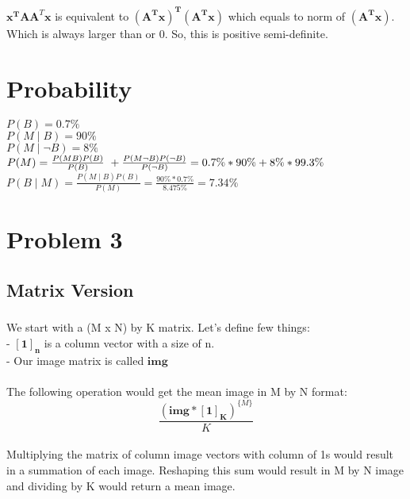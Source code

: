 \documentclass{article}
\newcommand{\matr}[1]{\mathbf{#1}}
\begin{document}
	\subsection{} %
	$\matr{{x}^{T}} \matr{A} \matr{A}^{T} \matr{x}$ is equivalent to $\matr{(A^{T}x)^{T}}\matr{(A^{T}x)}$ which equals to 
	norm of $\matr{(A^{T}x)}$. Which is always larger than or 0. So, this is positive semi-definite.
	\newpage
\section {Probability}
	$P(B) = 0.7\%$\\
	$P(M \mid B) = 90\%$\\
	$P(M \mid \neg B) = 8\%$\\
	$P(M)  = \frac{P(MB) P(B)}{P(B)} \ + \frac{P(M \neg B) P(\neg B)}{P(\neg B)}  = 0.7\% * 90\% + 8\% * 99.3\%\\$
	$P(B \mid M)  = \frac{P(M \mid B) P(B)}{P(M)} = \frac{90\% * 0.7\%}{8.475\%} = \mathbf{7.34\%}$

\section {Problem 3}
	\subsection{Matrix Version} %
		\subsubsection{} %

		We start with a (M x N) by K matrix. Let's define few things:\\
		- $\matr{[1]_{n}}$ is a column vector with a size of n.\\
		- Our image matrix is called $\matr{img}$\\
		\\
		The following operation would get the mean image in M by N format:\\	
		\begin{equation*}
		\frac{(\matr{img}*\matr{[1]_{K}})^{\{M\}}}{K}
		\end{equation*}
		\\
		Multiplying the matrix of column image vectors with column of 1s would result in a summation of each image.
		Reshaping this sum would result in M by N image and dividing by K would return a mean image.
		\\
\end{document}
